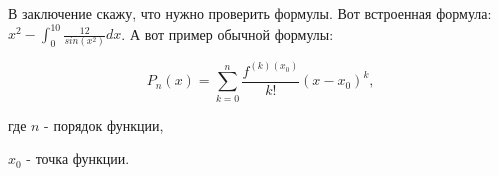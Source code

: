 
В заключение скажу, что нужно проверить формулы. Вот встроенная формула: $x^2 - \int_{0}^{10} \frac{12}{sin(x^2)} dx$. А вот пример обычной формулы: 

\begin{equation}
	P_n(x) = \sum_{k=0}^{n} \frac{f^{(k)(x_0)}}{k!}(x-x_0)^k \text{,}
\end{equation}

где $n$ - порядок функции, \par
$x_0$ - точка функции.